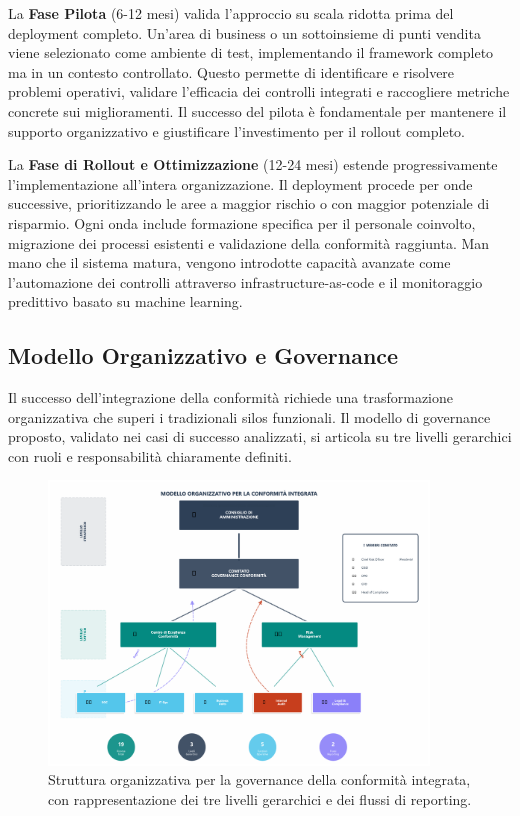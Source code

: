 La \textbf{Fase Pilota} (6-12 mesi) valida l'approccio su scala ridotta prima del deployment completo. Un'area di business o un sottoinsieme di punti vendita viene selezionato come ambiente di test, implementando il framework completo ma in un contesto controllato. Questo permette di identificare e risolvere problemi operativi, validare l'efficacia dei controlli integrati e raccogliere metriche concrete sui miglioramenti. Il successo del pilota è fondamentale per mantenere il supporto organizzativo e giustificare l'investimento per il rollout completo.

La \textbf{Fase di Rollout e Ottimizzazione} (12-24 mesi) estende progressivamente l'implementazione all'intera organizzazione. Il deployment procede per onde successive, prioritizzando le aree a maggior rischio o con maggior potenziale di risparmio. Ogni onda include formazione specifica per il personale coinvolto, migrazione dei processi esistenti e validazione della conformità raggiunta. Man mano che il sistema matura, vengono introdotte capacità avanzate come l'automazione dei controlli attraverso infrastructure-as-code e il monitoraggio predittivo basato su machine learning.

\subsection{\texorpdfstring{Modello Organizzativo e Governance}{4.5.2 - Modello Organizzativo e Governance}}
\label{subsec:4.5.2_governance}

Il successo dell'integrazione della conformità richiede una trasformazione organizzativa che superi i tradizionali silos funzionali. Il modello di governance proposto, validato nei casi di successo analizzati, si articola su tre livelli gerarchici con ruoli e responsabilità chiaramente definiti.

\begin{figure}[h]
\centering
\includegraphics[width=0.9\textwidth]{thesis_figures/cap4/organigramma_moderno.pdf}
\caption{Struttura organizzativa per la governance della conformità integrata, con rappresentazione dei tre livelli gerarchici e dei flussi di reporting.}
\label{fig:governance}
\end{figure}

